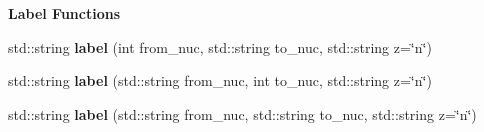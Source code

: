 \begin{Indent}{\bf Label Functions}
\begin{DoxyCompactItemize}
\item 
std\+::string {\bfseries label} (int from\+\_\+nuc, std\+::string to\+\_\+nuc, std\+::string z=\char`\"{}n\char`\"{})\hypertarget{namespacepyne_1_1rxname_a2e4d7d20d4278d6b6b5b57592fab287b}{}\label{namespacepyne_1_1rxname_a2e4d7d20d4278d6b6b5b57592fab287b}

\item 
std\+::string {\bfseries label} (std\+::string from\+\_\+nuc, int to\+\_\+nuc, std\+::string z=\char`\"{}n\char`\"{})\hypertarget{namespacepyne_1_1rxname_aff83b91df8abe88197680a467b843969}{}\label{namespacepyne_1_1rxname_aff83b91df8abe88197680a467b843969}

\item 
std\+::string {\bfseries label} (std\+::string from\+\_\+nuc, std\+::string to\+\_\+nuc, std\+::string z=\char`\"{}n\char`\"{})\hypertarget{namespacepyne_1_1rxname_aa316be9d06a9987cb9816cc26926a237}{}\label{namespacepyne_1_1rxname_aa316be9d06a9987cb9816cc26926a237}

\end{DoxyCompactItemize}
\end{Indent}
